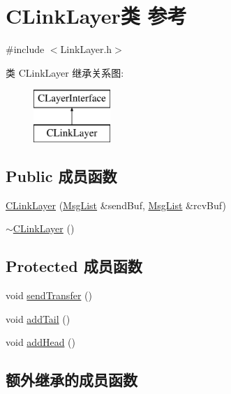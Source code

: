 \hypertarget{class_c_link_layer}{}\section{C\+Link\+Layer类 参考}
\label{class_c_link_layer}


{\ttfamily \#include $<$Link\+Layer.\+h$>$}

类 C\+Link\+Layer 继承关系图\+:\begin{figure}[H]
\begin{center}
\leavevmode
\includegraphics[height=2.000000cm]{class_c_link_layer}
\end{center}
\end{figure}
\subsection*{Public 成员函数}
\begin{DoxyCompactItemize}
\item 
\hyperlink{class_c_link_layer_a74cefcec9517de56f587fb26d646d610}{C\+Link\+Layer} (\hyperlink{class_msg_list}{Msg\+List} \&send\+Buf, \hyperlink{class_msg_list}{Msg\+List} \&rcv\+Buf)
\item 
\hyperlink{class_c_link_layer_a47070db4af2382a2241455a62c93c4a5}{$\sim$\+C\+Link\+Layer} ()
\end{DoxyCompactItemize}
\subsection*{Protected 成员函数}
\begin{DoxyCompactItemize}
\item 
void \hyperlink{class_c_link_layer_ab6a4124af45069fefeddff784ea26e3f}{send\+Transfer} ()
\item 
void \hyperlink{class_c_link_layer_a0962e4887e1893721031309a1e49a638}{add\+Tail} ()
\item 
void \hyperlink{class_c_link_layer_a6ef143071b324acea3cd11ef86ba850f}{add\+Head} ()
\end{DoxyCompactItemize}
\subsection*{额外继承的成员函数}


